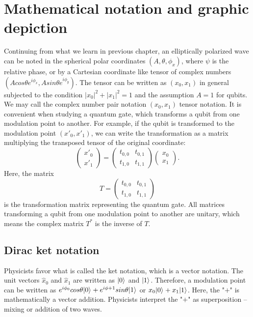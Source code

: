 \documentclass[oneside, letter, 12pt]{book}
\begin{document}
\section{Mathematical notation and graphic depiction}
Continuing from what we learn in previous chapter, an elliptically polarized wave can be noted in the spherical polar coordinates $(A, \theta, \phi_x)$, where $\psi$ is the relative phase, or by a Cartesian coordinate like tensor of complex numbers $(A cos\theta e^{i\phi_x}, A sin\theta e^{i\phi_y})$. The tensor can be written as $(x_0, x_1)$ in general subjected to the condition $|x_0|^2 + |x_1|^2 = 1$ and the assumption $A=1$ for qubits. We may call the complex number pair notation $(x_0, x_1)$ tensor notation. It is convenient when studying a quantum gate, which transforms a qubit from one modulation point to another. For example, if the qubit is transformed to the modulation point $(x'_0, x'_1)$, we can write the transformation as a matrix multiplying the transposed tensor of the original coordinate:
\begin{equation}
    \begin{pmatrix}
    x'_0 \\
    x'_1
\end{pmatrix}
=
    \begin{pmatrix}
    t_{0,0} & t_{0,1} \\
    t_{1,0} & t_{1,1} 
\end{pmatrix}
    \begin{pmatrix}
    x_0 \\
    x_1
\end{pmatrix}.
\end{equation}
Here, the matrix
\begin{equation}\label{e-T}
T
=
    \begin{pmatrix}
    t_{0,0} & t_{0,1} \\
    t_{1,0} & t_{1,1} 
\end{pmatrix}
\end{equation}
is the transformation matrix representing the quantum gate. All matrices transforming a qubit from one modulation point to another are unitary, which means the complex matrix $T^*$ is the inverse of $T$.

\subsection{Dirac ket notation}
Physicists favor what is called the ket notation, which is a vector notation. The unit vectors $\hat x_0$ and $\hat x_1$ are written as $\vert {0} \rangle_{}$ and $\vert {1} \rangle_{}$. Therefore, a modulation point can be written as $e^{i \phi_0}cos{\theta} \vert {0} \rangle_{} + e^{i \phi+1} sin{\theta} \vert {1} \rangle_{}$ or $x_0 \vert {0} \rangle_{} + x_1 \vert {1} \rangle_{}$. Here, the "$+$" is mathematically a vector addition. Physicists interpret the "$+$" as superposition -- mixing or addition of two waves.
\end{document}

